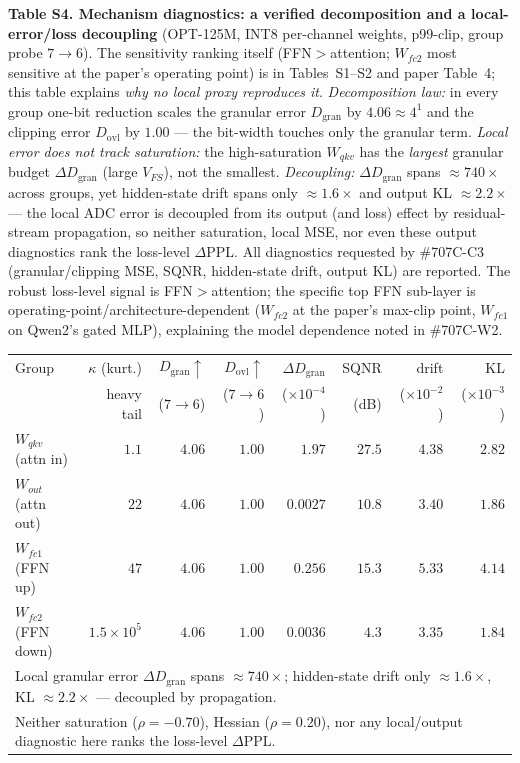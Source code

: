 \documentclass[10pt]{article}
\begin{document}
\vspace{0.8em}
\noindent\textbf{Table S4. Mechanism diagnostics: a verified decomposition and a
local-error/loss decoupling} (OPT-125M, INT8 per-channel weights, p99-clip, group
probe $7{\to}6$). The sensitivity ranking itself (FFN$>$attention; $W_{fc2}$ most
sensitive at the paper's operating point) is in Tables~S1--S2 and paper Table~4;
this table explains \emph{why no local proxy reproduces it}. \emph{Decomposition
law:} in every group one-bit reduction scales the granular error
$D_{\mathrm{gran}}$ by $4.06\!\approx\!4^{1}$ and the clipping error
$D_{\mathrm{ovl}}$ by $1.00$ --- the bit-width touches only the granular term.
\emph{Local error does not track saturation:} the high-saturation $W_{qkv}$ has the
\emph{largest} granular budget $\Delta D_{\mathrm{gran}}$ (large $V_{FS}$), not the
smallest. \emph{Decoupling:} $\Delta D_{\mathrm{gran}}$ spans $\approx\!740\times$
across groups, yet hidden-state drift spans only $\approx\!1.6\times$ and output KL
$\approx\!2.2\times$ --- the local ADC error is decoupled from its output (and loss)
effect by residual-stream propagation, so neither saturation, local MSE, nor even
these output diagnostics rank the loss-level $\Delta$PPL. All diagnostics requested
by \#707C-C3 (granular/clipping MSE, SQNR, hidden-state drift, output KL) are
reported. The robust loss-level signal is FFN$>$attention; the specific top FFN
sub-layer is operating-point/architecture-dependent ($W_{fc2}$ at the paper's
max-clip point, $W_{fc1}$ on Qwen2's gated MLP), explaining the model dependence
noted in \#707C-W2.

\begin{center}
\footnotesize
\setlength{\tabcolsep}{5.5pt}
\begin{tabular}{lrrrrrrr}
\toprule
Group & $\kappa$ (kurt.) & $D_{\mathrm{gran}}{\uparrow}$ & $D_{\mathrm{ovl}}{\uparrow}$ & $\Delta D_{\mathrm{gran}}$ & SQNR & drift & KL \\
 & heavy tail & ($7{\to}6$) & ($7{\to}6$) & ($\times10^{-4}$) & (dB) & ($\times10^{-2}$) & ($\times10^{-3}$) \\
\midrule
$W_{qkv}$ (attn in)  & $1.1$             & $4.06$ & $1.00$ & $1.97$   & $27.5$ & $4.38$ & $2.82$ \\
$W_{out}$ (attn out) & $22$              & $4.06$ & $1.00$ & $0.0027$ & $10.8$ & $3.40$ & $1.86$ \\
$W_{fc1}$ (FFN up)   & $47$              & $4.06$ & $1.00$ & $0.256$  & $15.3$ & $5.33$ & $4.14$ \\
$W_{fc2}$ (FFN down) & $1.5\times10^{5}$ & $4.06$ & $1.00$ & $0.0036$ & $4.3$  & $3.35$ & $1.84$ \\
\midrule
\multicolumn{8}{l}{Local granular error $\Delta D_{\mathrm{gran}}$ spans $\approx\!740\times$; hidden-state drift only $\approx\!1.6\times$, KL $\approx\!2.2\times$ --- decoupled by propagation.}\\
\multicolumn{8}{l}{Neither saturation ($\rho{=}{-}0.70$), Hessian ($\rho{=}0.20$), nor any local/output diagnostic here ranks the loss-level $\Delta$PPL.}\\
\bottomrule
\end{tabular}
\end{center}
\end{document}
